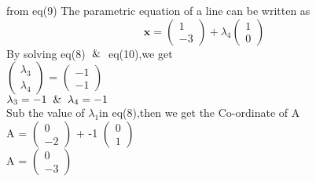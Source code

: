 \documentclass[journal,10pt,twocolumn]{article}
\newcommand{\myvec}[1]{\ensuremath{\begin{pmatrix}#1\end{pmatrix}}}
\begin{document}
\begin{flushleft}
from eq(9) The parametric equation of a line can be written as
\begin{equation}
     \boldsymbol{x} = \myvec{1 \\ -3} + \lambda_4\myvec{1 \\ 0}
\end{equation}
By solving eq(8) $\And$ eq(10),we get
\vspace{0.3cm}\\
 \myvec{\lambda_3 \\ \lambda_4} =  \myvec{-1 \\ -1}
\vspace{0.3cm}\\
$\lambda_3=-1 \And \lambda_4=-1$
\vspace{0.3cm}\\
Sub the value of $\lambda_1$in eq(8),then we get the Co-ordinate of A
\vspace{0.3cm}\\
A =  \myvec{0 \\ -2} + -1  \myvec{0 \\ 1}
\vspace{0.3cm}\\
A = \myvec{0 \\ -3}

\end{flushleft}
\end{document}
